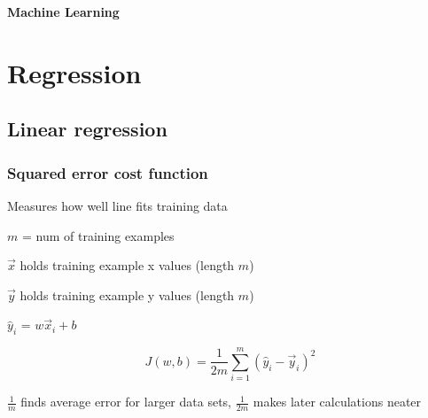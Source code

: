 \documentclass[12pt]{article}
\begin{document}
\newcommand*\dif{\mathop{}\!\mathrm{d}}

\newenvironment{myitemize}
{ \begin{itemize}
    \setlength{\itemsep}{0pt}
    \setlength{\parskip}{0pt}
    \setlength{\parsep}{0pt}     }
{ \end{itemize}                  } 

\newenvironment{myenumerate}
{ \begin{enumerate}
    \setlength{\itemsep}{0pt}
    \setlength{\parskip}{0pt}
    \setlength{\parsep}{0pt}     }
{ \end{enumerate}                  } 

\begin{titlepage}
\begin{center}
\vspace*{2cm}
\begin{huge}\textbf{Machine Learning}\end{huge}
\end{center}
\end{titlepage}

\tableofcontents


\pagebreak

\section{Regression}

\subsection{Linear regression}
\subsubsection{Squared error cost function}

Measures how well line fits training data

$m$ = num of training examples

$\vec{x}$ holds training example x values (length $m$)

$\vec{y}$ holds training example y values (length $m$)

$\hat y_i$ = $w\vec{x}_i + b$

\[ J(w,b) = \frac{1}{2m} \sum_{i=1}^m ({\hat y}_i - \vec{y}_i)^2 \]

$\frac{1}{m}$ finds average error for larger data sets, $\frac{1}{2m}$ makes later calculations neater
\end{document}
